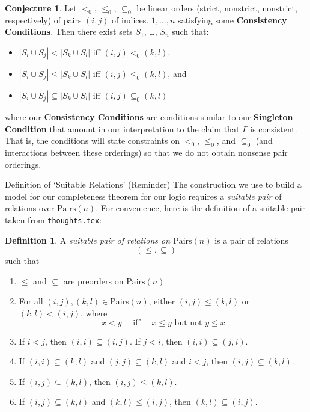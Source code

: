\documentclass[12pt]{article}
\theoremstyle{definition}
\newtheorem{definition}{Definition}
\newtheorem{conjecture}{Conjecture}
\newcommand{\quadiff}{\quad \mbox{ iff } \quad}
\newcommand{\Pairs}{\mbox{Pairs}}
\newcommand{\provsub}{\subseteq_{\Gamma}}
\newcommand{\provle}{\le_{\Gamma}}
\newcommand{\provlt}{<_{\Gamma}}
\newcommand{\code}[1]{\colorbox{light-gray}{\texttt{#1}}}
\begin{document}
\begin{conjecture}
    Let $<_0$, $\le_0$, $\subseteq_0$ be linear orders (strict, nonstrict, nonstrict, respectively) of pairs $(i, j)$ of indices. $1, \ldots, n$ satisfying some \textbf{Consistency Conditions}.  Then there exist sets $S_1$, \ldots, $S_n$ such that:
    
    \begin{itemize}
        \item $|S_i \cup S_j| < |S_k \cup S_l|$ iff $(i, j) <_0 (k, l)$,
        \item $|S_i \cup S_j| \le |S_k \cup S_l|$ iff $(i, j) \le_0 (k, l)$, and
        \item $|S_i \cup S_j| \subseteq |S_k \cup S_l|$ iff $(i, j) \subseteq_0 (k, l)$
    \end{itemize}
\end{conjecture}

where our \textbf{Consistency Conditions} are conditions similar to our \textbf{Singleton Condition} that amount in our interpretation to the claim that $\Gamma$ is consistent.  That is, the conditions will state constraints on $<_0$, $\le_0$, and $\subseteq_0$ (and interactions between these orderings) so that we do not obtain nonsense pair orderings.


\begin{section}{Definition of `Suitable Relations' (Reminder)}
The construction we use to build a model for our completeness theorem for our logic requires a \textit{suitable pair} of relations over $\Pairs(n)$.
For convenience, here is the definition of a suitable pair taken from \code{thoughts.tex}:

\begin{definition}
A \emph{suitable pair of relations on $\Pairs(n)$} is a pair of relations
\[ (\le, \subseteq) \]
such that 
\begin{enumerate}
\item $\le$ and $\subseteq$ are preorders on $\Pairs(n)$.
\item  
 For all $(i,j), (k,l)\in \Pairs(n)$,
 either $(i,j) \le (k,l)$ or $(k,l) < (i,j)$, where
 \[ x < y \quadiff x \le y \mbox{ but not } y \le x\]
 \item If $i < j$, then $(i,i) \subseteq (i,j)$.  If $j < i$, then $(i,i) \subseteq (j,i)$. 
 \item If $(i,i) \subseteq (k,l)$ and $(j,j) \subseteq (k,l)$ and $i < j$,
 then $(i,j) \subseteq (k,l)$.
\item If $(i,j) \subseteq (k,l)$, then $(i,j) \le (k,l)$.
\item If $(i,j) \subseteq (k,l)$ and $(k,l) \le (i,j)$, then $(k,l) \subseteq (i,j)$.
\end{enumerate}
\label{def-suitable-pair}
\end{definition}

\end{section}
\end{document}
